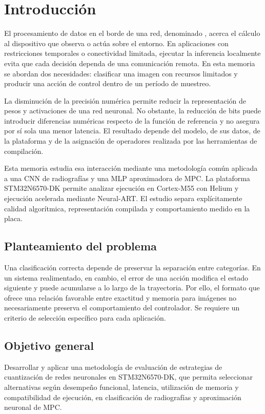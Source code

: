 \chapter{Introducción}\label{cap:introduccion}
El procesamiento de datos en el borde de una red, denominado , acerca el cálculo al dispositivo que observa o actúa sobre el entorno. En aplicaciones con restricciones temporales o conectividad limitada, ejecutar la inferencia localmente evita que cada decisión dependa de una comunicación remota. En esta memoria se abordan dos necesidades: clasificar una imagen con recursos limitados y producir una acción de control dentro de un período de muestreo.

La disminución de la precisión numérica permite reducir la representación de pesos y activaciones de una red neuronal. No obstante, la reducción de bits puede introducir diferencias numéricas respecto de la función de referencia y no asegura por sí sola una menor latencia. El resultado depende del modelo, de sus datos, de la plataforma y de la asignación de operadores realizada por las herramientas de compilación.

Esta memoria estudia esa interacción mediante una metodología común aplicada a una CNN de radiografías y una MLP aproximadora de MPC. La plataforma STM32N6570-DK permite analizar ejecución en Cortex-M55 con Helium y ejecución acelerada mediante Neural-ART. El estudio separa explícitamente calidad algorítmica, representación compilada y comportamiento medido en la placa.

\section{Planteamiento del problema}
Una clasificación correcta depende de preservar la separación entre categorías. En un sistema realimentado, en cambio, el error de una acción modifica el estado siguiente y puede acumularse a lo largo de la trayectoria. Por ello, el formato que ofrece una relación favorable entre exactitud y memoria para imágenes no necesariamente preserva el comportamiento del controlador. Se requiere un criterio de selección específico para cada aplicación.

\section{Objetivo general}
Desarrollar y aplicar una metodología de evaluación de estrategias de cuantización de redes neuronales en STM32N6570-DK, que permita seleccionar alternativas según desempeño funcional, latencia, utilización de memoria y compatibilidad de ejecución, en clasificación de radiografías y aproximación neuronal de MPC.


